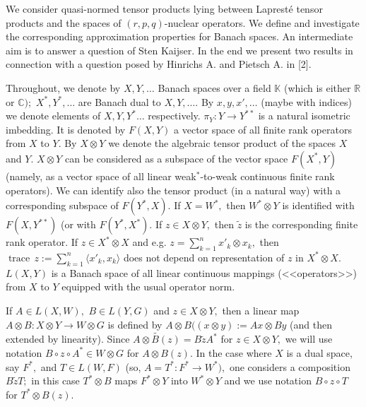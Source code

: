 




We consider quasi-normed tensor products lying between
Laprest\'e tensor products and the spaces of $(r,p,q)$-nuclear ope\-rators.
We define and investigate the corresponding approxima\-tion pro\-per\-ties for Banach spaces.
An intermediate aim is to answer a question of Sten Kaijser.  In the end we present two results in connection with
a question posed by  Hinrichs A. and Pietsch A. in [2].

Throughout, we denote by $X,Y, \dots$ Banach spaces over a field $\mathbb K$
(which is either $\mathbb R$ or $\mathbb C);$ $X^*, Y^*,\dots$ are
Banach dual to $X, Y, \dots.$ By $x, y, x',\dots$ (maybe with indices) we denote elements of
$X, Y,  Y^*\dots$ respectively. $\pi_Y: Y\to Y^{**}$ is a natural isometric imbedding.
It is denoted by $F(X,Y)$ a vector space of all finite rank operators
from $X$ to $Y.$ By $X\otimes Y$ we denote the algebraic tensor product of the spaces
$X$ and $Y.$
  $X\otimes Y$ can be considered as a subspace of the vector space $F(X^*, Y)$
(namely, as a vector space of all linear weak${^*}$-to-weak continuous
finite rank operators). We can identify also the tensor product (in a natural way)
with a corresponding subspace of $F(Y^*,X).$ If $X=W^*,$ then
$W^*\otimes Y$ is identified with $F(X,Y^{**})$ (or with $F(Y^*,X^*).$
If $z\in X\otimes Y,$ then $\widetilde z$ is the corresponding finite rank operator.
If $z\in X^*\otimes X$ and e.g. $z=\sum_{k=1}^n x'_k\otimes x_k,$ then
   $\operatorname{trace}\, z:= \sum_{k=1}^n \langle x'_k, x_k\rangle$ does not depend on representation
   of $z$ in $X^*\otimes X.$
 $L(X,Y)$ is a Banach space of all linear continuous mappings (<<operators>>)
 from $X$ to $Y$ equipped with the usual operator norm.


  If $A\in L(X,W),$ $B\in L(Y,G)$ and $z\in X\otimes Y,$ then  a linear map
  $A\otimes B: X\otimes Y\to W\otimes G$ is defined by
  $A\otimes B((x\otimes y):= Ax\otimes By$ (and then extended by linearity). Since
 $\widetilde{A\otimes B(z)}= B\widetilde z A^*$ for $z\in X\otimes Y,$ we will use notation
$B\circ z \circ A^*\in W\otimes G$ for $A\otimes B(z).$
In the case where $X$ is a dual space, say $F^*,$ and $T\in L(W,F)$
(so, $A=T^*: F^*\to W^*),$
one considers a composition $B\widetilde z T;$ in this case $T^*\otimes B$ maps
$F^*\otimes Y$ into $W^*\otimes Y$ and
we use notation
$B\circ z\circ T$ for $T^*\otimes B (z).$

